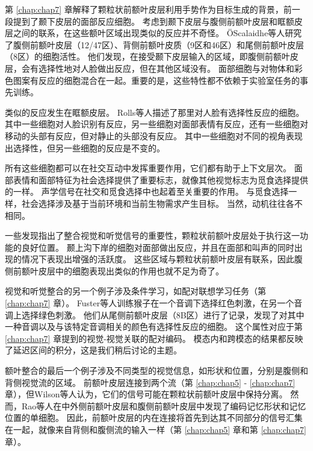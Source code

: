 第 \ref{chap:chap7} 章解释了颗粒状前额叶皮层利用手势作为目标生成的背景，前一段提到了颞下皮层的面部反应细胞。
考虑到颞下皮层与腹侧前额叶皮层和眶额皮层之间的联系，在这些额叶区域出现类似的反应并不奇怪。
ÖScalaidhe等人\cite{o1999face}研究了腹侧前额叶皮层（12/47区）、背侧前额叶皮质（9区和46区）和尾侧前额叶皮层（8区）的细胞活性。
他们发现，在接受颞下皮层输入的区域，即腹侧前额叶皮层，会有选择性地对人脸做出反应，但在其他区域没有。
面部细胞与对物体和彩色图案有反应的细胞混合在一起。重要的是，这些特性都不依赖于实验室任务的事先训练。
\par


类似的反应发生在眶额皮层。
Rolls等人\cite{rolls2006face}描述了那里对人脸有选择性反应的细胞。
其中一些细胞对人脸识别有反应，另一些细胞对面部表情有反应，还有一些细胞对移动的头部有反应，但对静止的头部没有反应。
其中一些细胞对不同的视角表现出选择性，但另一些细胞的反应是不变的。
\par


所有这些细胞都可以在社交互动中发挥重要作用，它们都有助于上下文层次。
面部表情和面部特征为社会选择提供了重要标志，就像其他视觉标志为觅食选择提供的一样。
声学信号在社交和觅食选择中也起着至关重要的作用。
与觅食选择一样，社会选择涉及基于当前环境和当前生物需求产生目标。
当然，动机往往各不相同。
\par


一些发现指出了整合视觉和听觉信号的重要性，颗粒状前额叶皮层处于执行这一功能的良好位置。
颞上沟下岸的细胞对面部做出反应，并且在面部和叫声的同时出现的情况下表现出增强的活跃度\cite{barraclough2005integration}。
这些区域与颗粒状前额叶皮层有联系，因此腹侧前额叶皮层中的细胞表现出类似的作用也就不足为奇了\cite{sugihara2006integration}。
\par


视觉和听觉整合的另一个例子涉及条件学习，如配对联想学习任务（第 \ref{chap:chap7} 章）。
Fuster等人\cite{fuster2000executive}训练猴子在一个音调下选择红色刺激，在另一个音调上选择绿色刺激。
他们从尾侧前额叶皮层（8B区）进行了记录，发现了对其中一种音调以及与该特定音调相关的颜色有选择性反应的细胞。
这个属性对应于第 \ref{chap:chap7} 章提到的视觉-视觉关联的配对编码。
模态内和跨模态的结果都反映了延迟区间的积分，这是我们稍后讨论的主题。
\par


额叶整合的最后一个例子涉及不同类型的视觉信息，如形状和位置，分别是腹侧和背侧视觉流的区域。
前额叶皮层连接到两个流（第 \ref{chap:chap5} - \ref{chap:chap7} 章），但Wilson等人\cite{wilson1993dissociation}认为，它们的信号可能在颗粒状前额叶皮层中保持分离。
然而，Rao等人\cite{rao1997integration}在中外侧前额叶皮层和腹侧前额叶皮层中发现了编码记忆形状和记忆位置的单细胞。
因此，前额叶皮层的内在连接将首先到达其不同部分的信号汇集在一起，就像来自背侧和腹侧流的输入一样（第 \ref{chap:chap5} 章和第 \ref{chap:chap7} 章）。
\par

